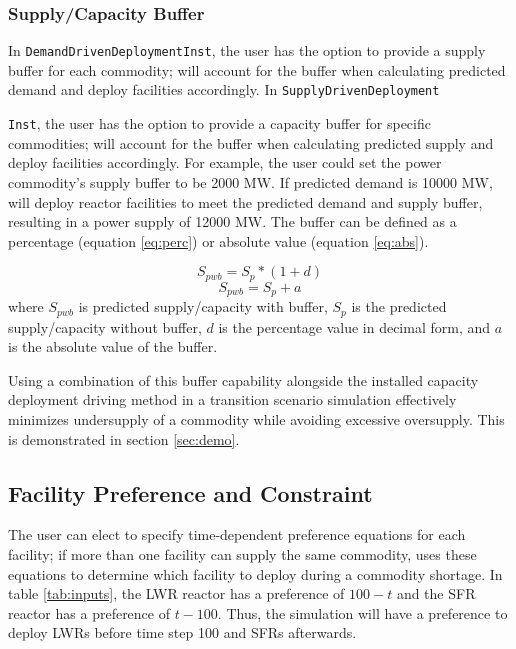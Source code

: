 \subsubsection{Supply/Capacity Buffer}
In \texttt{DemandDrivenDeploymentInst}, the user has the option 
to provide a supply buffer for each commodity; \deploy will account 
for the buffer when calculating predicted demand and 
deploy facilities accordingly.
In \texttt{SupplyDrivenDeployment}

\noindent 
\texttt{Inst},
the user has the option 
to provide a capacity buffer for specific commodities; 
\deploy will account 
for the buffer when calculating predicted supply and 
deploy facilities accordingly.
For example, the user could set the power commodity's supply buffer 
to be 2000 MW. 
If predicted demand is 10000 MW, \deploy will deploy reactor 
facilities to meet the predicted demand and supply buffer, resulting 
in a power supply of 12000 MW.  
The buffer can be defined as a percentage (equation \ref{eq:perc}) 
or absolute value (equation \ref{eq:abs}). 

\begin{equation}
    \label{eq:perc}
    S_{pwb} = S_{p}*(1+d)
\end{equation}
\begin{equation}
    \label{eq:abs}
    S_{pwb} = S_{p}+a
\end{equation}
where $S_{pwb}$ is predicted supply/capacity with buffer, 
$S_p$ is the predicted supply/capacity without buffer, 
$d$ is the percentage value in decimal form, 
and $a$ is the absolute value of the buffer. 

Using a combination of this buffer capability alongside the 
installed capacity deployment driving method in a transition 
scenario simulation effectively minimizes undersupply of a 
commodity while avoiding excessive oversupply. 
This is demonstrated in section \ref{sec:demo}. 

\subsection{Facility Preference and Constraint}
\label{sec:constrain}
The user can elect to specify time-dependent preference equations 
for each facility; if more than one facility can supply the same 
commodity, \deploy uses these equations to determine which facility 
to deploy during a commodity shortage. 
In table \ref{tab:inputs}, 
the \gls{LWR} reactor has a preference of $100-t$ and the 
\gls{SFR} reactor has a preference of $t-100$. 
Thus, the simulation will have a preference to deploy 
\glspl{LWR} before time step 100 and \glspl{SFR} afterwards. 

